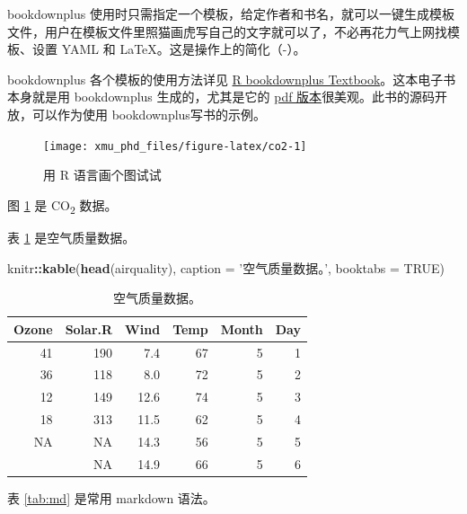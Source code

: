 \documentclass[UTF8, openany]{pkuthss}
\newenvironment{Shaded}{\begin{snugshade}}{\end{snugshade}}
\newcommand{\KeywordTok}[1]{\textcolor[rgb]{0.13,0.29,0.53}{\textbf{{#1}}}}
\newcommand{\DataTypeTok}[1]{\textcolor[rgb]{0.13,0.29,0.53}{{#1}}}
\newcommand{\StringTok}[1]{\textcolor[rgb]{0.31,0.60,0.02}{{#1}}}
\newcommand{\OtherTok}[1]{\textcolor[rgb]{0.56,0.35,0.01}{{#1}}}
\newcommand{\OperatorTok}[1]{\textcolor[rgb]{0.81,0.36,0.00}{\textbf{{#1}}}}
\newcommand{\NormalTok}[1]{{#1}}
\begin{document}
bookdownplus 使用时只需指定一个模板，给定作者和书名，就可以一键生成模板文件，用户在模板文件里照猫画虎写自己的文字就可以了，不必再花力气上网找模板、设置 YAML 和 LaTeX。这是操作上的简化（-）。

bookdownplus 各个模板的使用方法详见 \href{https://bookdown.org/baydap/bookdownplus}{R bookdownplus Textbook}。这本电子书本身就是用 bookdownplus 生成的，尤其是它的 \href{https://bookdown.org/baydap/bookdownplus/bookdownplus.pdf}{pdf 版本}很美观。此书的源码开放，可以作为使用 bookdownplus写书的示例。

\begin{figure}[H]

{\centering \texttt{[image: xmu\_phd\_files/figure-latex/co2-1]} 

}

\caption[用 R 语言画个图试试]{用 R 语言画个图试试}\label{fig:co2}
\end{figure}

图 \ref{fig:co2} 是 CO\textsubscript{2} 数据。

表 \ref{tab:tabair} 是空气质量数据。

\begin{Shaded}
\begin{Highlighting}[]
\NormalTok{knitr}\OperatorTok{::}\KeywordTok{kable}\NormalTok{(}\KeywordTok{head}\NormalTok{(airquality), }\DataTypeTok{caption =} \StringTok{'空气质量数据。'}\NormalTok{,}
                   \DataTypeTok{booktabs =} \OtherTok{TRUE}\NormalTok{)}
\end{Highlighting}
\end{Shaded}

\begin{table}[t]

\caption{\label{tab:tabair}空气质量数据。}
\centering
\begin{tabular}{rrrrrr}
\toprule
Ozone & Solar.R & Wind & Temp & Month & Day\\
\midrule
41 & 190 & 7.4 & 67 & 5 & 1\\
36 & 118 & 8.0 & 72 & 5 & 2\\
12 & 149 & 12.6 & 74 & 5 & 3\\
18 & 313 & 11.5 & 62 & 5 & 4\\
NA & NA & 14.3 & 56 & 5 & 5\\
\addlinespace
28 & NA & 14.9 & 66 & 5 & 6\\
\bottomrule
\end{tabular}
\end{table}

表 \ref{tab:md} 是常用 markdown 语法。
\end{document}
